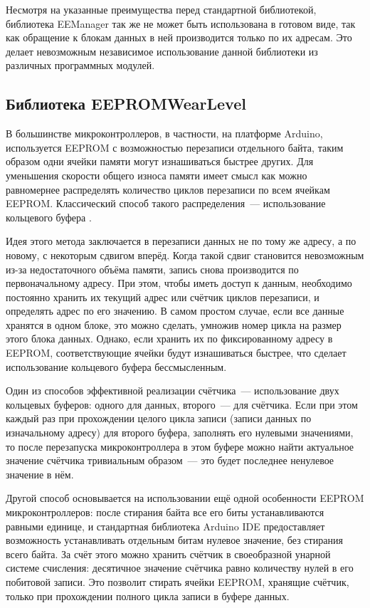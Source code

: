 Несмотря на указанные преимущества перед стандартной библиотекой, библиотека EEManager так же не может быть использована в готовом виде, так как обращение к блокам данных в ней производится только по их адресам.
Это делает невозможным независимое использование данной библиотеки из различных программных модулей.


\subsection{Библиотека EEPROMWearLevel}

В большинстве микроконтроллеров, в частности, на платформе Arduino, используется EEPROM с возможностью перезаписи отдельного байта, таким образом одни ячейки памяти могут изнашиваться быстрее других.
Для уменьшения скорости общего износа памяти имеет смысл как можно равномернее распределять количество циклов перезаписи по всем ячейкам EEPROM.
Классический способ такого распределения~--- использование кольцевого буфера \cite{web:circular-buffer}.

Идея этого метода заключается в перезаписи данных не по тому же адресу, а по новому, с некоторым сдвигом вперёд. Когда такой сдвиг становится невозможным из-за недостаточного объёма памяти, запись снова производится по первоначальному адресу.
При этом, чтобы иметь доступ к данным, необходимо постоянно хранить их текущий адрес или счётчик циклов перезаписи, и определять адрес по его значению.
В самом простом случае, если все данные хранятся в одном блоке, это можно сделать, умножив номер цикла на размер этого блока данных.
Однако, если хранить их по фиксированному адресу в EEPROM, соответствующие ячейки будут изнашиваться быстрее, что сделает использование кольцевого буфера бессмысленным.

Один из способов эффективной реализации счётчика~--- использование двух кольцевых буферов: одного для данных, второго~--- для счётчика.
Если при этом каждый раз при прохождении целого цикла записи (записи данных по изначальному адресу) для второго буфера, заполнять его нулевыми значениями, то после перезапуска микроконтроллера в этом буфере можно найти актуальное значение счётчика тривиальным образом~--- это будет последнее ненулевое значение в нём.

Другой способ основывается на использовании ещё одной особенности EEPROM микроконтроллеров: после стирания байта все его биты устанавливаются равными единице, и стандартная библиотека Arduino IDE предоставляет возможность устанавливать отдельным битам нулевое значение, без стирания всего байта.
За счёт этого можно хранить счётчик в своеобразной унарной системе счисления: десятичное значение счётчика равно количеству нулей в его побитовой записи.
Это позволит стирать ячейки EEPROM, хранящие счётчик, только при прохождении полного цикла записи в буфере данных.

